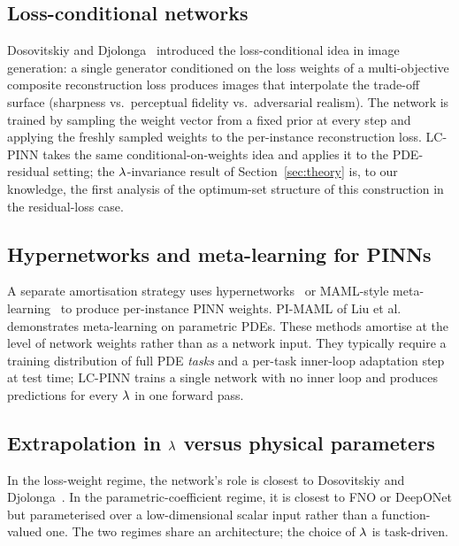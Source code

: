 \documentclass[12pt,a4paper]{extarticle}
\begin{document}
\subsection{Loss-conditional networks}

Dosovitskiy and Djolonga~\cite{dosovitskiy2020} introduced the loss-conditional idea in image generation: a single generator conditioned on the loss weights of a multi-objective composite reconstruction loss produces images that interpolate the trade-off surface (sharpness vs.\ perceptual fidelity vs.\ adversarial realism). The network is trained by sampling the weight vector from a fixed prior at every step and applying the freshly sampled weights to the per-instance reconstruction loss. LC-PINN takes the same conditional-on-weights idea and applies it to the PDE-residual setting; the $\lambda$-invariance result of Section~\ref{sec:theory} is, to our knowledge, the first analysis of the optimum-set structure of this construction in the residual-loss case.

\subsection{Hypernetworks and meta-learning for PINNs}

A separate amortisation strategy uses hypernetworks~\cite{ha2017hypernetworks} or MAML-style meta-learning~\cite{finn2017maml} to produce per-instance PINN weights. PI-MAML of Liu et al.~\cite{liu2022meta-pinn} demonstrates meta-learning on parametric PDEs. These methods amortise at the level of network weights rather than as a network input. They typically require a training distribution of full PDE \emph{tasks} and a per-task inner-loop adaptation step at test time; LC-PINN trains a single network with no inner loop and produces predictions for every $\lambda$ in one forward pass.

\subsection{Extrapolation in \texorpdfstring{$\lambda$}{lambda} versus physical parameters}

In the loss-weight regime, the network's role is closest to Dosovitskiy and Djolonga~\cite{dosovitskiy2020}. In the parametric-coefficient regime, it is closest to FNO or DeepONet but parameterised over a low-dimensional scalar input rather than a function-valued one. The two regimes share an architecture; the choice of $\lambda$ is task-driven.
\end{document}
